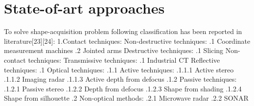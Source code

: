 \section{State-of-art approaches}
To solve shape-acquisition problem following classification has been reported in literature[23][24]:\newline
1.Contact techniques:\newline
{} Non-destructive techniques:\newline
\indent {}.1 Coordinate measurement machines\newline
\indent {}.2 Jointed arms\newline
{} Destructive techniques:\newline
\indent {}.1 Slicing Non-contact techniques:\newline
{} Transmissive techniques:\newline
\indent {}.1 Industrial CT\newline
{} Reflective techniques:\newline
\indent {}.1 Optical techniques:\newline
\indent \indent {}.1.1 Active techniques:\newline
\indent \indent \indent {}.1.1.1 Active stereo\newline
\indent \indent \indent {}.1.1.2 Imaging radar\newline
\indent \indent \indent {}.1.1.3 Active depth from defocus\newline
\indent \indent {}.1.2 Passive techniques:\newline
\indent \indent \indent {}.1.2.1 Passive stereo\newline
\indent \indent \indent {}.1.2.2 Depth from defocus\newline           
\indent \indent \indent {}.1.2.3 Shape from shading\newline
\indent \indent \indent {}.1.2.4 Shape from silhouette\newline
\indent {}.2 Non-optical methods:\newline
\indent \indent {}.2.1 Microwave radar\newline
\indent \indent \indent {}.2.2 SONAR\newline

